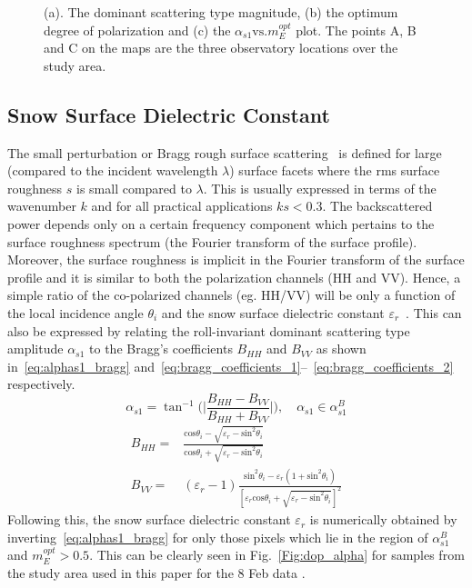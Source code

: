 \begin{figure}[!h]
	\caption{(a). The dominant scattering type magnitude, (b) the optimum degree of polarization and (c) the $\alpha_{s1} \mbox{vs.} m_{E}^{opt}$ plot. The points A, B and C on the maps are the three observatory locations over the study area.}
	\label{fig:results_1}
\end{figure}	
\subsection{Snow Surface Dielectric Constant}
The small perturbation or Bragg rough surface scattering~\cite{tsang1985theory} is defined for large (compared to the incident wavelength $\lambda$) surface facets where the rms surface roughness $s$ is small compared to $\lambda$. This is usually expressed in terms of the wavenumber $k$ and for all practical applications $ks < 0.3$. The backscattered power depends only on a certain frequency component which pertains to the surface roughness spectrum (the Fourier transform of the surface profile). Moreover, the surface roughness is implicit in the Fourier transform of the surface profile and it is similar to both the polarization channels (HH and VV). Hence, a simple ratio of the co-polarized channels (eg. HH/VV) will be only a function of the local incidence angle $\theta_{i}$ and the snow surface dielectric constant $\varepsilon_{r}$~\cite{cloude2009polarisation}. This can also be expressed by relating the roll-invariant dominant scattering type amplitude $\alpha_{s1}$ to the Bragg's coefficients $B_{HH}$ and $B_{VV}$ as shown in~\eqref{eq:alphas1_bragg} and~\eqref{eq:bragg_coefficients_1}--~\eqref{eq:bragg_coefficients_2} respectively.
\begin{equation}
\alpha_{s1}=\tan^{-1}\Bigg(\Bigg|\frac{B_{HH}-B_{VV}}{B_{HH}+B_{VV}}\Bigg|\Bigg), \quad \alpha_{s1} \in \alpha_{s1}^{B}
\label{eq:alphas1_bragg}
\end{equation}
\begin{subequations}
	\begin{align}
	B_{HH} =& \frac{\mbox{cos}\theta_{i} - \sqrt{\varepsilon_{r} - \mbox{sin}^2\theta_{i}}}{\mbox{cos}\theta_{i} + \sqrt{\varepsilon_{r} - \mbox{sin}^2\theta_{i}}} \label{eq:bragg_coefficients_1}\\
	B_{VV} =& (\varepsilon_{r}-1)\frac{\mbox{sin}^2\theta_{i} - \varepsilon_{r}(1 + \mbox{sin}^2\theta_{i})}{\left[\varepsilon_{r}\mbox{cos}\theta_{i} + \sqrt{\varepsilon_{r} - \mbox{sin}^2\theta_{i}}\right]^2} \label{eq:bragg_coefficients_2}
	\end{align}
\end{subequations}
Following this, the snow surface dielectric constant $\varepsilon_{r}$ is numerically obtained by inverting~\eqref{eq:alphas1_bragg} for only those pixels which lie in the region of $\alpha_{s1}^{B}$ and $m_{E}^{opt} > 0.5$. This can be clearly seen in Fig.~\ref{Fig:dop_alpha} for samples from the study area used in this paper for the 8 Feb data . 


